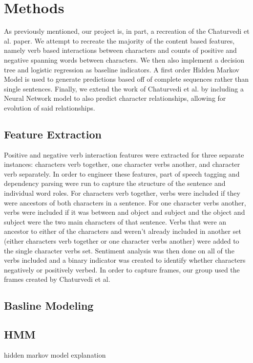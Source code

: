 \documentclass[11pt,a4paper]{article}
\begin{document}
\section{Methods}
As previously mentioned, our project is, in part, a recreation of the Chaturvedi et al. paper. We attempt to recreate the majority of the content based features, namely verb based interactions between characters and counts of positive and negative spanning words between characters. We then also implement a decision tree and logistic regression as baseline indicators. A first order Hidden Markov Model is used to generate predictions based off of complete sequences rather than single sentences. Finally, we extend the work of Chaturvedi et al. by including a Neural Network model to also predict character relationships, allowing for evolution of said relationships.

\subsection{Feature Extraction}
Positive and negative verb interaction features were extracted for three separate instances: characters verb together, one character verbs another, and character verb separately. In order to engineer these features, part of speech tagging and dependency parsing were run to capture the structure of the sentence and individual word roles. For characters verb together, verbs were included if they were ancestors of both characters in a sentence. For one character verbs another, verbs were included if it was between and object and subject and the object and subject were the two main characters of that sentence. Verbs that were an ancestor to either of the characters and weren't already included in another set (either characters verb together or one character verbs another) were added to the single character verbs set. Sentiment analysis was then done on all of the verbs included and a binary indicator was created to identify whether characters negatively or positively verbed. 
In order to capture frames, our group used the frames created by Chaturvedi et al.

\subsection{Basline Modeling}



\subsection{HMM}
hidden markov model explanation 
\end{document}
